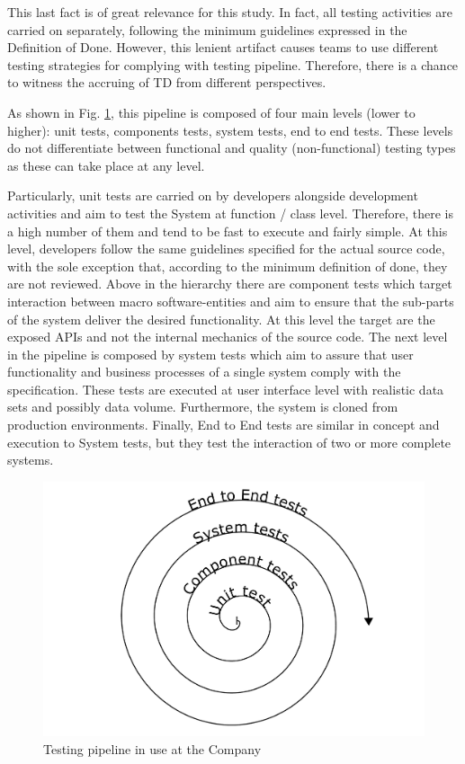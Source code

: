 This last fact is of great relevance for this study. In fact, all testing activities are carried on separately, following the minimum guidelines expressed in the Definition of Done. However, this lenient artifact causes teams to use different testing strategies for complying with testing pipeline. Therefore, there is a chance to witness the accruing of TD from different perspectives. 

As shown in Fig. \ref{fig:testing_pipeline}, this pipeline is composed of four main levels (lower to higher): unit tests, components tests, system tests, end to end tests. These levels do not differentiate between functional and quality (non-functional) testing types as these can take place at any level. 

Particularly, unit tests are carried on by developers alongside development activities and aim to test the System at function / class level. Therefore, there is a high number of them and tend to be fast to execute and fairly simple. At this level, developers follow the same guidelines specified for the actual source code, with the sole exception that, according to the minimum definition of done, they are not reviewed. Above in the hierarchy there are component tests which target interaction between macro software-entities and aim to ensure that the sub-parts of the system deliver the desired functionality. At this level the target are the exposed APIs and not the internal mechanics of the source code. The next level in the pipeline is composed by system tests which aim to assure that user functionality and business processes of a single system comply with the specification. These tests are executed at user interface level with realistic data sets and possibly data volume. Furthermore, the system is cloned from production environments. Finally, End to End tests are similar in concept and execution to System tests, but they test the interaction of two or more complete systems.


\begin{figure}[ht]
    \centering
    \includegraphics[width=\textwidth]{figure/testing_pipeline.pdf}
    \caption{Testing pipeline in use at the Company}
    \label{fig:testing_pipeline}
\end{figure}

